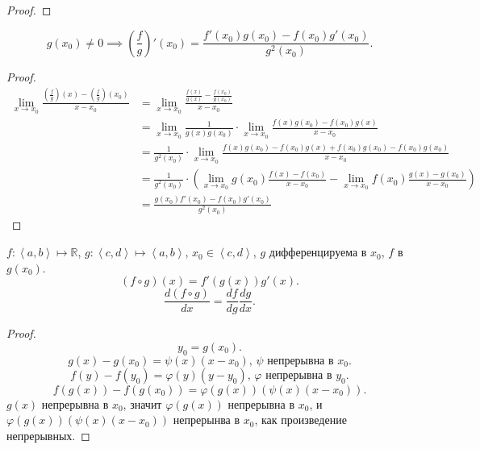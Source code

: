 \documentclass[11pt, oneside]{article}   	%
\begin{document}
\begin{theorem}
\begin{proof}
          \end{proof}
          \[ g(x_0) \neq 0 \implies \left(\frac{f}{g}\right)'(x_0) = \frac{f'(x_0)g(x_0) -f(x_0)g'(x_0)}{g^2(x_0)}  .\]
          \begin{proof}
              \begin{equation*}
                  \begin{split}
                      \lim\limits_{x \to x_0} \frac{\left( \frac{f}{g} \right)(x) - \left( \frac{f}{g} \right)(x_0)  }{x-x_0}
                      &= \lim\limits_{x \to x_0} \frac{\frac{f(x)}{g(x)} - \frac{f(x_0)}{g(x_0)}}{x-x_0}\\
                      &= \lim\limits_{x \to x_0} \frac{1}{g(x)g(x_0)} \cdot \lim\limits_{x \to x_0} \frac{f(x)g(x_0)-f(x_0)g(x)}{x-x_0}\\
                      &= \frac{1}{g^2(x_0)} \cdot \lim\limits_{x \to x_0} \frac{f(x)g(x_0)-f(x_0)g(x)+f(x_0)g(x_0)-f(x_0)g(x_0)}{x-x_0}\\
                      &= \frac{1}{g^2(x_0)} \cdot  \left(\lim\limits_{x \to x_0} g(x_0) \frac{f(x)-f(x_0)}{x-x_0} -  \lim\limits_{x \to x_0} f(x_0) \frac{g(x)-g(x_0)}{x-x_0}\right)\\
                      &= \frac{g(x_0)f'(x_0)-f(x_0)g'(x_0)}{g^2(x_0)}
                  \end{split}
              \end{equation*}
          \end{proof} 
      \end{theorem}
      \begin{theorem}
          $f:\left<a, b\right> \mapsto \mathbb{R}$, $g: \left<c, d\right> \mapsto \left<a, b\right>$, $x_0\in \left<c, d\right>$, $g$ дифференцируема в $x_0$, $f$ в $g(x_0)$.
          \[ (f\circ g)(x) = f'(g(x))g'(x) .\]
          \[ \frac{d(f\circ g)}{dx} = \frac{df}{dg}\frac{dg}{dx} .\]
          \begin{proof}
              \[ y_0 = g(x_0) .\] 
              \[ g(x)-g(x_0) = \psi(x)(x-x_0) \text{, $\psi$ непрерывна в  $x_0$} .\]
              \[ f(y)-f(y_0) = \varphi(y)(y-y_0) \text{, $\varphi$ непрерывна в $y_0$} .\] 
              \[ f(g(x))-f(g(x_0)) = \varphi(g(x))(\psi(x)(x-x_0)) .\]
              $g(x)$ непрерывна в $x_0$, значит $\varphi(g(x))$ непрерывна в $x_0$, и $\varphi(g(x))(\psi(x)(x-x_0))$ непрерынва в $x_0$, как произведение непрерывных.
          \end{proof}
      \end{theorem}
\end{document}
